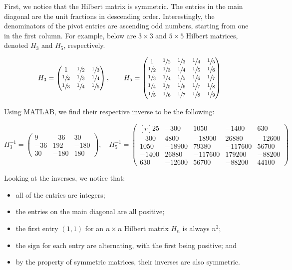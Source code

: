 \documentclass[12pt]{article}
\begin{document}
First, we notice that the Hilbert matrix is symmetric. The entries in the main diagonal are the unit fractions in descending order. Interestingly, the denominators of the pivot entries are ascending odd numbers, starting from one in the first column. For example, below are $3\times3$ and $5\times5$ Hilbert matrices, denoted $H_3$ and $H_5$, respectively.

$$
H_3 = \begin{pmatrix*}
    1 & \sfrac{1}{2} & \sfrac{1}{3} \\
    \sfrac{1}{2} & \sfrac{1}{3} & \sfrac{1}{4} \\
    \sfrac{1}{3} & \sfrac{1}{4} & \sfrac{1}{5}
\end{pmatrix*}
,\qquad
H_5 = \begin{pmatrix*}
    1 & \sfrac{1}{2} & \sfrac{1}{3} & \sfrac{1}{4} & \sfrac{1}{5} \\
    \sfrac{1}{2} & \sfrac{1}{3} & \sfrac{1}{4} & \sfrac{1}{5} & \sfrac{1}{6} \\
    \sfrac{1}{3} & \sfrac{1}{4} & \sfrac{1}{5} & \sfrac{1}{6} & \sfrac{1}{7} \\
    \sfrac{1}{4} & \sfrac{1}{5} & \sfrac{1}{6} & \sfrac{1}{7} & \sfrac{1}{8} \\
    \sfrac{1}{5} & \sfrac{1}{6} & \sfrac{1}{7} & \sfrac{1}{8} & \sfrac{1}{9}
\end{pmatrix*}
$$

Using MATLAB, we find their respective inverse to be the following:

$$
H_3^{-1} = \begin{pmatrix*}
    9 & -36 & 30 \\
    -36 & 192 & -180 \\
    30 & -180 & 180
\end{pmatrix*}
,\quad
H_5^{-1} = \begin{pmatrix*}[r]
    25 & -300 & 1050 & -1400 & 630 \\
    -300 & 4800 & -18900 & 26880 & -12600 \\
    1050 & -18900 & 79380 & -117600 & 56700 \\
    -1400 & 26880 & -117600 & 179200 & -88200 \\
    630 & -12600 & 56700 & -88200 & 44100
\end{pmatrix*}
$$

Looking at the inverses, we notice that:
\begin{itemize}
    \item all of the entries are integers;
    \item the entries on the main diagonal are all positive;
    \item the first entry $(1,1)$ for an $n\times n$ Hilbert matrix $H_n$ is always $n^2$;
    \item the sign for each entry are alternating, with the first being positive; and
    \item by the property of symmetric matrices, their inverses are also symmetric.
\end{itemize}
\end{document}
